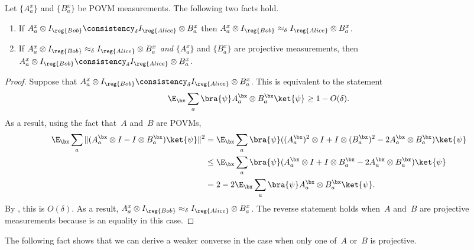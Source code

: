 \begin{fact}\label{fact:agreement}
Let $\{A^x_a\}$ and $\{B^x_a\}$ be POVM measurements.
The following two facts hold.
\begin{enumerate}
\item If $A^x_a \otimes I_{\reg{Bob}} \consistency_{\delta} I_{\reg{Alice}} \otimes B^x_a$
	then $A^x_a \otimes I_{\reg{Bob}} \approx_{\delta} I_{\reg{Alice}} \otimes B^x_a$.
\item If $A^x_a \otimes I_{\reg{Bob}} \approx_{\delta} I_{\reg{Alice}} \otimes B^x_a$ \emph{and} $\{A^x_a\}$ and $\{B^x_a\}$ are projective measurements,
	then $A^x_a \otimes I_{\reg{Bob}} \consistency_{\delta} I_{\reg{Alice}} \otimes B^x_a$.\label{item:partial-converse}
\end{enumerate}
\end{fact}
\begin{proof}
Suppose that $A^x_a \otimes I_{\reg{Bob}} \consistency_{\delta} I_{\reg{Alice}} \otimes B^x_a$.
This is equivalent to the statement
\begin{equation}\label{eq:i-derived-a-formula}
\E_{\bx} \sum_a \bra{\psi} A^{\bx}_a \otimes B^{\bx}_a \ket{\psi} \geq 1- O(\delta).
\end{equation}
As a result, using the fact that~$A$ and~$B$ are POVMs,
\begin{align}
\E_{\bx} \sum_a \Vert (A_{a}^{\bx}\otimes I - I \otimes B_{a}^{\bx} ) \ket{\psi}\Vert^2 
& = \E_{\bx} \sum_a \bra{\psi} ((A_{a}^{\bx})^2\otimes I + I \otimes (B_{a}^{\bx})^2 - 2 A_a^{\bx} \otimes B_{a}^{\bx}) \ket{\psi}\nonumber\\
& \leq \E_{\bx} \sum_a \bra{\psi} (A_{a}^{\bx}\otimes I + I \otimes B_{a}^{\bx} - 2 A_a^{\bx} \otimes B_{a}^{\bx}) \ket{\psi}\label{eq:sometimes-tight}\\
& = 2 - 2 \E_{\bx} \sum_a \bra{\psi} A_a^{\bx} \otimes B_{a}^{\bx} \ket{\psi}\nonumber.
\end{align}
By , this is $O(\delta)$.
As a result, $A^x_a \otimes I_{\reg{Bob}} \approx_{\delta} I_{\reg{Alice}} \otimes B^x_a$.
The reverse statement holds when~$A$ and~$B$ are projective measurements
because  is an equality in this case.
\end{proof}

The following fact shows that we can derive a weaker converse in the case when only one of~$A$ or~$B$ is projective.

